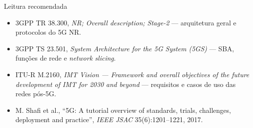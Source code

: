 \documentclass[aspectratio=169,11pt]{beamer}
\begin{document}
\begin{frame}{Leitura recomendada}
  \begin{itemize}
    \item 3GPP TR 38.300, \emph{NR; Overall description; Stage-2} --- arquitetura geral e protocolos do 5G NR.
    \item 3GPP TS 23.501, \emph{System Architecture for the 5G System (5GS)} --- SBA, funções de rede e \emph{network slicing}.
    \item ITU-R M.2160, \emph{IMT Vision --- Framework and overall objectives of the future development of IMT for 2030 and beyond} --- requisitos e casos de uso das redes pós-5G.
    \item M. Shafi et al., ``5G: A tutorial overview of standards, trials, challenges, deployment and practice'', \emph{IEEE JSAC} 35(6):1201--1221, 2017.
  \end{itemize}
\end{frame}
\end{document}
